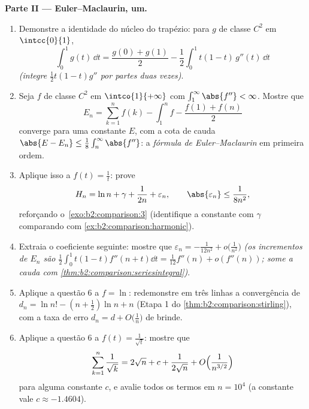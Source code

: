 \begin{problem}
\medskip
\noindent\textbf{Parte II --- Euler--Maclaurin,  um.}
\begin{enumerate}[resume]
  \item Demonstre a identidade do núcleo do trapézio: para $g$ de classe
        $C^2$ em $\intcc{0}{1}$,
        \[
        \int_0^1 g(t)\,\dd t = \frac{g(0) + g(1)}{2}
        - \frac12\int_0^1 t(1 - t)\,g''(t)\,\dd t
        \]
        \emph{(integre $\frac12 t(1-t)g''$ por partes duas vezes)}.
  \item Seja $f$ de classe $C^2$ em $\intco{1}{+\infty}$ com
        $\int_1^\infty \abs{f''} < \infty$. Mostre que
        \[
        E_n = \sum_{k=1}^{n} f(k) - \int_1^n f -
        \frac{f(1) + f(n)}{2}
        \]
        converge para uma constante $E$, com a cota de cauda
        $\abs{E - E_n} \leq \frac18\int_n^\infty\abs{f''}$: a
        \emph{fórmula de Euler--Maclaurin} em primeira ordem.
  \item Aplique isso a $f(t) = \frac1t$: prove
        \[
        H_n = \ln n + \gamma + \frac{1}{2n} + \varepsilon_n,
        \qquad \abs{\varepsilon_n} \leq \frac{1}{8n^2},
        \]
        reforçando o~\cref{exo:b2:comparison:3} (identifique a
        constante com $\gamma$ comparando com
        \cref{ex:b2:comparison:harmonic}).
  \item Extraia o coeficiente seguinte: mostre que $\varepsilon_n =
        -\frac{1}{12n^2} + o\bigl(\frac1{n^2}\bigr)$
        \emph{(os incrementos de $E_n$ são
        $\frac12\int_0^1t(1-t)f''(n+t)\dd t =
        \frac1{12}f''(n) + o(f''(n))$; some a cauda com
        \cref{thm:b2:comparison:seriesintegral})}.
  \item Aplique a questão 6 a $f = \ln$: redemonstre em três linhas
        a convergência de $d_n = \ln n! - (n +
        \frac12)\ln n + n$ (Etapa 1 do
        \cref{thm:b2:comparison:stirling}), com a taxa de erro
        $d_n = d + O\bigl(\frac1n\bigr)$ de brinde.
  \item Aplique a questão 6 a $f(t) = \frac{1}{\sqrt t}$: mostre que
        \[
        \sum_{k=1}^{n}\frac1{\sqrt k} = 2\sqrt n + c +
        \frac{1}{2\sqrt n} + O\Bigl(\frac{1}{n^{3/2}}\Bigr)
        \]
        para alguma constante $c$, e avalie todos os termos em $n =
        10^4$ (a constante vale $c \approx -1.4604$).
\end{enumerate}


\end{problem}
